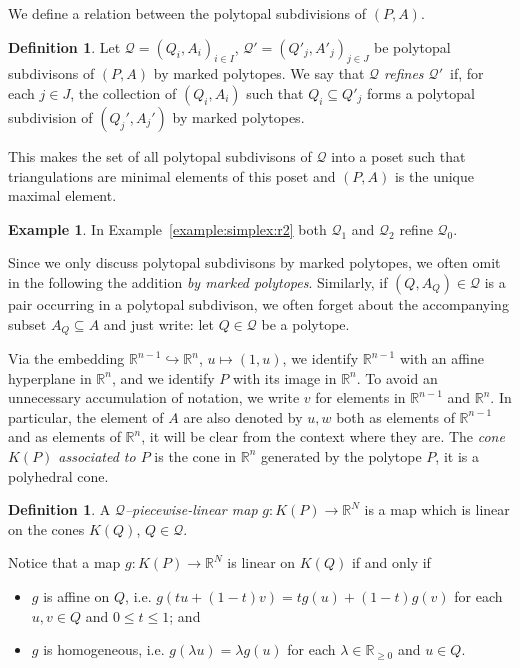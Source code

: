\documentclass[12pt, a4article]{amsart}   	%
\numberwithin{equation}{section}
\theoremstyle{plain}
\theoremstyle{definition}
\newtheorem{example}[theorem]{Example}
\newtheorem{definition}[theorem]{Definition}
\newcommand{\R}{{\mathbb R}}
\newcommand{\mcQ}{{\mathcal Q}}
\begin{document}
We define a relation between the polytopal subdivisions of $(P,A)$.

\begin{definition}\label{def:refine:subdivision}
Let  $\mathcal Q=(Q_i,A_i)_{i\in I}$,  $\mathcal Q'=(Q'_j,A'_j)_{j\in J}$ be polytopal subdivisons of $(P,A)$ by marked polytopes. We say that \emph{$\mathcal Q$ refines $\mathcal Q'$\,} if, for each $j\in J$, the collection of $(Q_i, A_i)$ such that $Q_i\subseteq Q'_j$ forms a polytopal subdivision of $(Q_j', A_j')$ by marked polytopes. 
\end{definition}
This makes the set of all polytopal subdivisons of $\mathcal Q$ into a poset such that
triangulations are minimal elements of this poset and $(P,A)$ is the unique maximal element.

\begin{example}
In Example~\ref{example:simplex:r2} both $\mathcal Q_1$ and $\mathcal Q_2$ refine $\mathcal Q_0$.
\end{example}

Since we only discuss polytopal subdivisons  by marked polytopes, 
we often omit in the following the addition \emph{by marked polytopes}.
Similarly, if $(Q,A_Q)\in \mathcal Q$ is a pair occurring in a polytopal subdivison, 
we often forget about the accompanying subset $A_Q\subseteq A$ and just write: 
let $Q\in\mathcal Q$ be a polytope.

\smallskip

Via the embedding $\mathbb R^{n-1}\hookrightarrow \mathbb R^n$, $u\mapsto (1,u)$, we identify $\mathbb R^{n-1}$ with an affine hyperplane in $\mathbb R^n$, and we identify $P$ with its image in $\mathbb R^n$. To avoid an unnecessary accumulation of notation, we write
$v$ for elements in $\R^{n-1}$ and $\R^n$. In particular, the element of $A$ are also denoted by $u, w$  both as elements of $\R^{n-1}$ 
and as elements of  $\R^n$, it will be clear from the context where they are.
The \textit{cone $K(P)$ associated to $P$} is the cone in $\mathbb R^n$ generated by the polytope $P$, it is a polyhedral cone.
 
\begin{definition}\label{definition:piecewise:linear}
A \textit{$\mathcal Q$--piecewise-linear map} $g: K(P) \rightarrow  \mathbb R^N$ is a map which is linear on the cones $K(Q)$, $Q\in\mcQ$.
\end{definition}

Notice that a map $g:K(P)\longrightarrow\R^N$ is linear on $K(Q)$ if and only if
\begin{itemize}
\item[(i)] $g$ is affine on $Q$, i.e. $g(t u + (1-t) v) = tg(u) + (1-t)g(v)$ for each $u, v\in Q$ and $0\leq t\leq 1$; and
\item[(ii)] $g$ is homogeneous, i.e. $g(\lambda  {u}) = \lambda g( {u})$ for each $\lambda\in\R_{\geq 0}$ and $ {u}\in Q$.
\end{itemize}
\end{document}
